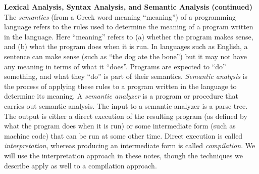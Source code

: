 \begin{minipage}[t]{\sw}
\slidenumber
\LARGE
{\bf Lexical Analysis, Syntax Analysis, and Semantic Analysis (continued)}\exx
The {\em semantics} (from a Greek word meaning ``meaning'')
of a programming language refers to
the rules used to determine the meaning
of a program written in the language.
Here ``meaning'' refers to
(a) whether the program makes sense, and 
(b) what the program does when it is run.
In languages such as English,
a sentence can make sense (such as ``the dog ate the bone'')
but it may not have any meaning in terms of what it ``does''.
Programs are expected to ``do'' something,
and what they ``do'' is part of their semantics.
{\em Semantic analysis} is the process
of applying these rules to a program written in the language
to determine its meaning.\exx
A {\em semantic analyzer} is a program or procedure
that carries out semantic analysis.
The input to a semantic analyzer is a parse tree.
The output is either a direct execution of the resulting program
(as defined by what the program does when it is run)
or some intermediate form
(such as machine code) that can be run at some other time.
Direct execution is called {\em interpretation},
whereas producing an intermediate form is called {\em compilation}.
We will use the interpretation approach in these notes,
though the techniques we describe apply as well
to a compilation approach.\exx
\end{minipage}
\clearpage
